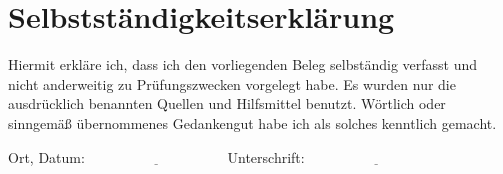 \section*{Selbstständigkeitserklärung}
\vspace{3cm}

Hiermit erkläre ich, dass ich den vorliegenden Beleg selbständig verfasst und nicht
anderweitig zu Prüfungszwecken vorgelegt habe. Es wurden nur die ausdrücklich benannten Quellen und Hilfsmittel benutzt. Wörtlich oder sinngemäß übernommenes Gedankengut habe ich als solches kenntlich gemacht.
\vspace{3cm}



Ort, Datum: $ \underline{\hspace{4cm}} $ \hspace{2cm} Unterschrift: $ \underline{\hspace{4cm}} $ 